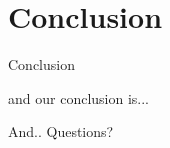 \documentclass{beamer}
\begin{document}
\section{Conclusion}

\begin{frame}{Conclusion}

	and our conclusion is...

\end{frame}

\begin{frame}

	\begin{block}{And.. }
	Questions?
	\end{block}

\end{frame}
\end{document}
